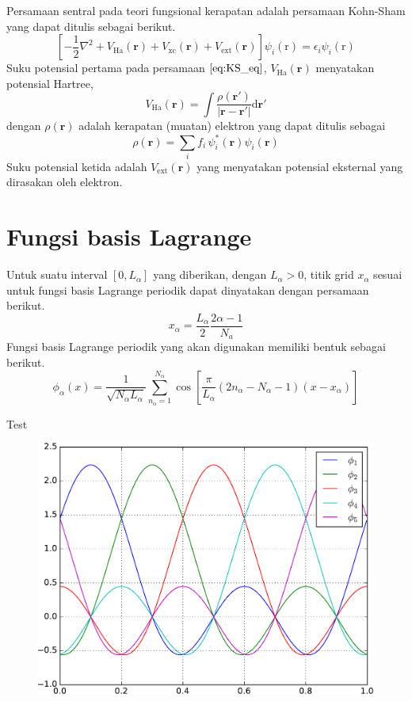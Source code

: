 \documentclass[%
reprint,
amsmath,
amssymb,
aps,
]{revtex4-1}
\begin{document}
Persamaan sentral pada teori fungsional kerapatan adalah persamaan
Kohn-Sham yang dapat ditulis sebagai berikut.
\begin{equation}
\left[
-\frac{1}{2}\nabla^2
+ V_{\mathrm{Ha}}(\mathbf{r})
+ V_{\mathrm{xc}}(\mathbf{r})
+ V_{\mathrm{ext}}(\mathbf{r})
\right]\psi_{i}(\mathrm{r}) =
\epsilon_{i} \psi_{i}(\mathrm{r})
\label{eq:KS_eq}
\end{equation}
Suku potensial pertama pada persamaan $\eqref{eq:KS_eq}$,
$V_{\mathrm{Ha}}(\mathbf{r})$ menyatakan potensial Hartree,
\begin{equation}
V_{\mathrm{Ha}}(\mathbf{r}) =
\int
\frac{\rho(\mathbf{r}')}{\left|\mathbf{r} - \mathbf{r}'\right|}
\mathrm{d}\mathbf{r}'
\end{equation}
dengan $\rho(\mathbf{r})$ adalah kerapatan (muatan) elektron
yang dapat ditulis sebagai
\begin{equation}
\rho(\mathbf{r}) = \sum_{i} f_{i}\, \psi^{*}_{i}(\mathbf{r}) \psi_{i}(\mathbf{r})
\end{equation}
Suku potensial ketida adalah $V_{\mathrm{ext}}(\mathbf{r})$
yang menyatakan potensial eksternal yang dirasakan oleh elektron.


\section{Fungsi basis Lagrange}

Untuk suatu interval $[0,L_{\alpha}]$ yang diberikan, dengan $L_{\alpha} > 0$, titik grid
$x_{\alpha}$ sesuai untuk fungsi basis
Lagrange periodik dapat dinyatakan dengan persamaan berikut.
\begin{equation}
x_{\alpha} = \frac{L_{\alpha}}{2}\frac{2\alpha-1}{N_{a}}
\end{equation}
Fungsi basis Lagrange periodik yang akan digunakan
memiliki bentuk sebagai berikut.
\begin{equation}
\phi_{\alpha}(x) = \frac{1}{\sqrt{N_{\alpha}L_{\alpha}}}
\sum_{n_{\alpha}=1}^{N_{\alpha}} \cos\left[
\frac{\pi}{L_{\alpha}}(2n_{\alpha} - N_{\alpha} - 1)(x-x_{\alpha})
\right]
\end{equation}

Test
\begin{figure}
\includegraphics[scale=0.5]{images/plotN_5.pdf}
\end{figure}
\end{document}
